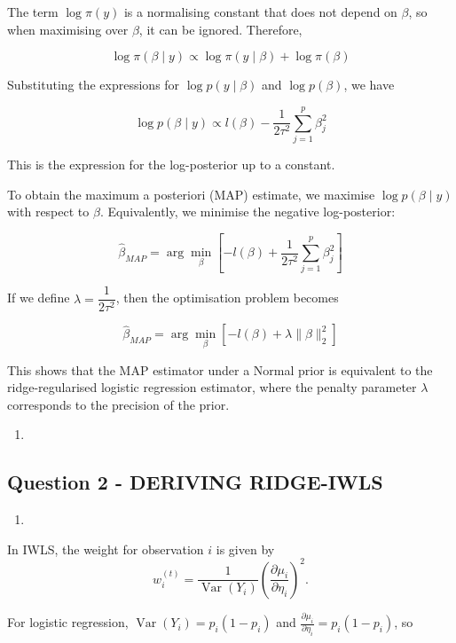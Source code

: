 \documentclass[12pt,halfline,a4paper,]{ouparticle}
\providecommand{\tightlist}{%
  \setlength{\itemsep}{0pt}\setlength{\parskip}{0pt}}
\begin{document}
The term \(\log \pi(y)\) is a normalising constant that does not depend
on \(\beta\), so when maximising over \(\beta\), it can be ignored.
Therefore,

\[\log \pi(\beta \mid y) \propto \log \pi(y \mid \beta) + \log \pi(\beta)\]

Substituting the expressions for \(\log p(y \mid \beta)\) and
\(\log p(\beta)\), we have

\[\log p(\beta \mid y) \propto l(\beta) - \dfrac{1}{2\tau^2}\sum_{j=1}^p \beta_j^2\]

This is the expression for the log-posterior up to a constant.

To obtain the maximum a posteriori (MAP) estimate, we maximise
\(\log p(\beta \mid y)\) with respect to \(\beta\). Equivalently, we
minimise the negative log-posterior:

\[\widehat{\beta}_{MAP} = \arg\min_\beta
\left[ -l(\beta) + \dfrac{1}{2\tau^2}\sum_{j=1}^p \beta_j^2 \right]\]

If we define \(\lambda = \dfrac{1}{2\tau^2}\), then the optimisation
problem becomes

\[\boxed{
\widehat{\beta}_{MAP}
= \arg\min_\beta \left[ -l(\beta) + \lambda \|\beta\|_2^2 \right]
}\]

This shows that the MAP estimator under a Normal prior is equivalent to
the ridge-regularised logistic regression estimator, where the penalty
parameter \(\lambda\) corresponds to the precision of the prior.

\begin{enumerate}
\def\labelenumi{(\alph{enumi})}
\setcounter{enumi}{1}
\tightlist
\item
\end{enumerate}

\subsection{Question 2 - DERIVING
RIDGE-IWLS}\label{question-2---deriving-ridge-iwls}

\begin{enumerate}
\def\labelenumi{(\alph{enumi})}
\tightlist
\item
\end{enumerate}

In IWLS, the weight for observation \(i\) is given by \[
w_i^{(t)} = \frac{1}{\operatorname{Var}(Y_i)} \left(\frac{\partial \mu_i}{\partial \eta_i}\right)^2.
\]

For logistic regression, \(\operatorname{Var}(Y_i) = p_i (1 - p_i)\) and
\(\frac{\partial \mu_i}{\partial \eta_i} = p_i (1 - p_i)\), so
\end{document}
